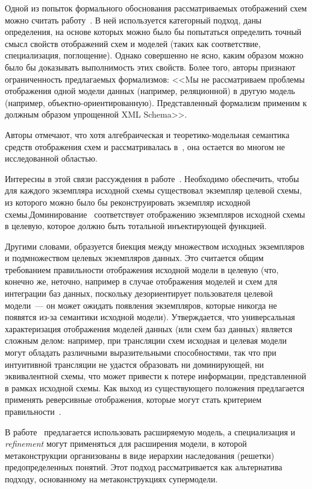 \begin{multicols}{2}
Одной из попыток формального обоснования рассматриваемых отображений
схем можно считать работу~\cite{Al01}. В ней используется категорный подход,
даны определения, на основе которых можно было бы попытаться
определить точный смысл свойств отображений схем и моделей (таких как
соответствие, специализация, поглощение). Однако совершенно не ясно,
каким образом можно было бы доказывать выполнимость этих свойств.
Более того, авторы признают ограниченность предлагаемых формализмов:
<<Mы не рассматриваем проблемы отображения одной модели данных
(например, реляционной) в другую модель (например, объектно-ориентированную).
Представленный формализм применим к должным образом
упрощенной XML Schema>>.

Авторы отмечают, что хотя алгебраическая и теоретико-модельная
семантика средств отображения схем и рассматривалась в~\cite{Al01, Mi94},
она остается во многом не исследованной областью.

Интересны в этой связи рассуждения в работе~\cite{At07}. Необходимо
обеспечить, чтобы для каждого экземпляра исходной схемы существовал
экземпляр целевой схемы, из которого можно было бы реконструировать
экземпляр исходной схемы.\linebreak Доминирование~\cite{Mi94}
соответствует отображению экземпляров исходной схемы в целевую,
которое должно быть тотальной инъектирующей функ\-цией. 

Другими словами,
образуется биекция между множеством исходных экземпляров и
подмножеством целевых экземпляров данных. Это считается общим
требованием правильности отображения исходной модели в целевую (что,
конечно же, неточно, например в случае отображения моделей и схем для
интеграции баз данных, поскольку дезориентирует пользователя целевой
модели~--- он может ожидать появления экземпляров, которые никогда не
появятся из-за семантики исходной модели). Утверждается, что
универсальная характеризация отоб\-ра\-же\-ния моделей данных (или схем баз
данных) является сложным делом: например, при трансляции схем исходная
и целевая модели могут обладать различными выразительными
способностями, так что при интуитивной трансляции не удастся
образовать ни доминирующей, ни эквивалентной схемы, что может привести
к потере информации, представленной в рамках исходной схемы. Как выход
из существующего положения предлагается применять реверсивные
отображения, которые могут стать критерием пра\-виль\-ности~\cite{Be03}.
{

}

В работе~\cite{Ba92} предлагается использовать расширяемую
модель, а специализация и {\em refinement} могут применяться для
расширения модели, в которой метаконструкции организованы в виде
иерархии наследования (решетки) предопределенных понятий.
Этот подход рассматривается как альтернатива подходу, основанному на
метаконструкциях супермодели.


\end{multicols}
